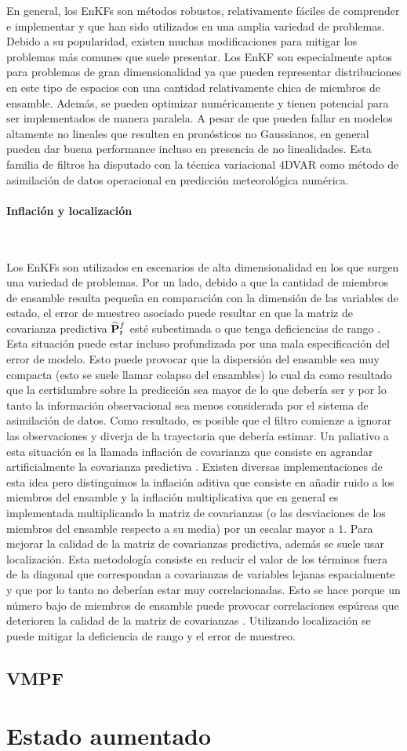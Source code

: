 En general, los EnKFs son métodos robustos, relativamente fáciles de comprender e implementar y que han sido utilizados en una amplia variedad de problemas. Debido a su popularidad, existen muchas modificaciones para mitigar los problemas más comunes que suele presentar. Los EnKF son especialmente aptos para problemas de gran dimensionalidad ya que pueden representar distribuciones en este tipo de espacios con una cantidad relativamente chica de miembros de ensamble. Además, se pueden optimizar numéricamente y tienen potencial para ser implementados de manera paralela. A pesar de que pueden fallar en modelos altamente no lineales que resulten en pronósticos no Gaussianos, en general pueden dar buena performance incluso en presencia de no linealidades. Esta familia de filtros ha disputado con la técnica variacional 4DVAR como método de asimilación de datos operacional en predicción meteorológica numérica.

\paragraph{Inflación y localización} \

Los EnKFs son utilizados en escenarios de alta dimensionalidad en los que surgen una variedad de problemas. Por un lado, debido a que la cantidad de miembros de ensamble resulta pequeña en comparación con la dimensión de las variables de estado, el error de muestreo asociado puede resultar en que la matriz de covarianza predictiva $\widehat{\mathbf{P}}_t^f$ esté subestimada o que tenga deficiencias de rango \citep{Miyoshi2011}. Esta situación puede estar incluso profundizada por una mala especificación del error de modelo. Esto puede provocar que la dispersión del ensamble sea muy compacta (esto se suele llamar colapso del ensambles) lo cual da como resultado que la certidumbre sobre la predicción sea mayor de lo que debería ser y por lo tanto la información observacional sea menos considerada por el sistema de asimilación de datos. Como resultado, es posible que el filtro comienze a ignorar las observaciones y diverja de la trayectoria que debería estimar. Un paliativo a esta situación es la llamada inflación de covarianza que consiste en agrandar artificialmente la covarianza predictiva \citep{Anderson1999}. Existen diversas implementaciones de esta idea pero distinguimos la inflación aditiva que consiste en añadir ruido a los miembros del ensamble y la inflación multiplicativa que en general es implementada multiplicando la matriz de covarianzas (o las desviaciones de los miembros del ensamble respecto a su media) por un escalar mayor a $1$. Para mejorar la calidad de la matriz de covarianzas predictiva, además se suele usar localización. Esta metodología consiste en reducir el valor de los términos fuera de la diagonal que correspondan a covarianzas de variables lejanas espacialmente y que por lo tanto no deberían estar muy correlacionadas. Esto se hace porque un número bajo de miembros de ensamble puede provocar correlaciones espúreas que deterioren la calidad de la matriz de covarianzas \citep{Hamill2001}. Utilizando localización se puede mitigar la deficiencia de rango y el error de muestreo. 

\subsection{VMPF}
\section{Estado aumentado}
